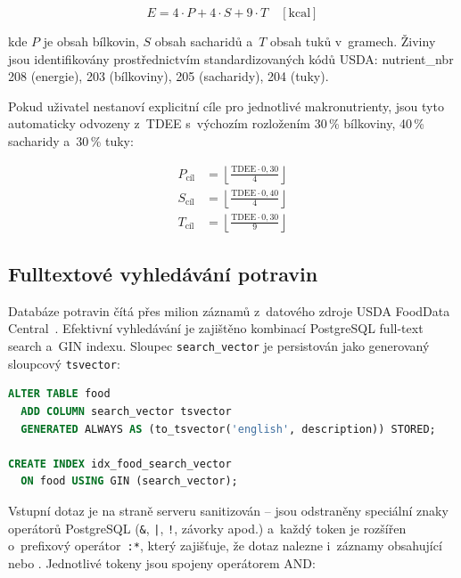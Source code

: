 \begin{equation}
  E = 4 \cdot P + 4 \cdot S + 9 \cdot T \quad [\text{kcal}]
  \label{eq:atwater}
\end{equation}

kde $P$ je obsah bílkovin, $S$ obsah sacharidů a~$T$ obsah tuků v~gramech.
Živiny jsou identifikovány prostřednictvím standardizovaných kódů USDA:
nutrient\_nbr 208 (energie), 203 (bílkoviny), 205 (sacharidy), 204 (tuky).

Pokud uživatel nestanoví explicitní cíle pro jednotlivé makronutrienty,
jsou tyto automaticky odvozeny z~TDEE s~výchozím rozložením 30\,\%
bílkoviny, 40\,\% sacharidy a~30\,\% tuky:

\begin{align}
  P_{\text{cíl}} & = \left\lfloor \frac{\text{TDEE} \cdot 0{,}30}{4} \right\rfloor \label{eq:macro-p} \\[4pt]
  S_{\text{cíl}} & = \left\lfloor \frac{\text{TDEE} \cdot 0{,}40}{4} \right\rfloor \label{eq:macro-s} \\[4pt]
  T_{\text{cíl}} & = \left\lfloor \frac{\text{TDEE} \cdot 0{,}30}{9} \right\rfloor \label{eq:macro-t}
\end{align}

\subsection{Fulltextové vyhledávání potravin}

Databáze potravin čítá přes milion záznamů z~datového zdroje USDA
FoodData Central~\cite{usda2024}. Efektivní vyhledávání je zajištěno
kombinací PostgreSQL full-text search a~GIN indexu. Sloupec
\texttt{search\_vector} je persistován jako generovaný sloupcový
\texttt{tsvector}:

\begin{lstlisting}[language=SQL, caption={Definice generovaného sloupce a GIN indexu},
  label={lst:tsvector}]
ALTER TABLE food
  ADD COLUMN search_vector tsvector
  GENERATED ALWAYS AS (to_tsvector('english', description)) STORED;

CREATE INDEX idx_food_search_vector
  ON food USING GIN (search_vector);
\end{lstlisting}

Vstupní dotaz je na straně serveru sanitizován -- jsou odstraněny speciální
znaky operátorů PostgreSQL (\texttt{\&}, \texttt{|}, \texttt{!}, závorky
apod.) a~každý token je rozšířen o~prefixový operátor~\texttt{:*},
který zajišťuje, že dotaz  nalezne i~záznamy obsahující
 nebo . Jednotlivé tokeny jsou spojeny
operátorem AND:

